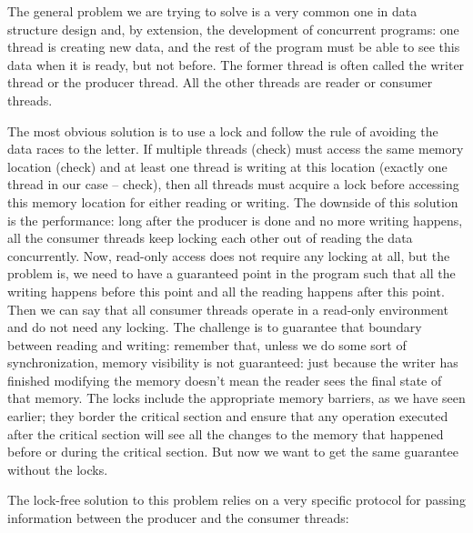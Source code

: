 
The general problem we are trying to solve is a very common one in data structure design and, by extension, the development of concurrent programs: one thread is creating new data, and the rest of the program must be able to see this data when it is ready, but not before. The former thread is often called the writer thread or the producer thread. All the other threads are reader or consumer threads.

The most obvious solution is to use a lock and follow the rule of avoiding the data races to the letter. If multiple threads (check) must access the same memory location (check) and at least one thread is writing at this location (exactly one thread in our case – check), then all threads must acquire a lock before accessing this memory location for either reading or writing. The downside of this solution is the performance: long after the producer is done and no more writing happens, all the consumer threads keep locking each other out of reading the data concurrently. Now, read-only access does not require any locking at all, but the problem is, we need to have a guaranteed point in the program such that all the writing happens before this point and all the reading happens after this point. Then we can say that all consumer threads operate in a read-only environment and do not need any locking. The challenge is to guarantee that boundary between reading and writing: remember that, unless we do some sort of synchronization, memory visibility is not guaranteed: just because the writer has finished modifying the memory doesn't mean the reader sees the final state of that memory. The locks include the appropriate memory barriers, as we have seen earlier; they border the critical section and ensure that any operation executed after the critical section will see all the changes to the memory that happened before or during the critical section. But now we want to get the same guarantee without the locks.

The lock-free solution to this problem relies on a very specific protocol for passing information between the producer and the consumer threads:

